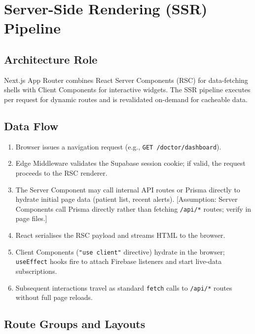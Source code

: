 \documentclass[12pt,a4paper]{report}
\begin{document}
\section{Server-Side Rendering (SSR) Pipeline}
\label{sec:ssr}

\subsection{Architecture Role}

Next.js App Router combines React Server Components (RSC) for
data-fetching shells with Client Components for interactive widgets.
The SSR pipeline executes per request for dynamic routes and is
revalidated on-demand for cacheable data.

\subsection{Data Flow}

\begin{enumerate}[leftmargin=1.5em, itemsep=0.2em]
  \item Browser issues a navigation request (e.g., \texttt{GET /doctor/dashboard}).
  \item Edge Middleware validates the Supabase session cookie; if valid,
        the request proceeds to the RSC renderer.
  \item The Server Component may call internal API routes or Prisma
        directly to hydrate initial page data (patient list, recent
        alerts). [Assumption: Server Components call Prisma directly
        rather than fetching \texttt{/api/*} routes; verify in page files.]
  \item React serialises the RSC payload and streams HTML to the browser.
  \item Client Components (\texttt{"use client"} directive) hydrate in
        the browser; \texttt{useEffect} hooks fire to attach Firebase
        listeners and start live-data subscriptions.
  \item Subsequent interactions travel as standard \texttt{fetch} calls
        to \texttt{/api/*} routes without full page reloads.
\end{enumerate}

\subsection{Route Groups and Layouts}
\end{document}
